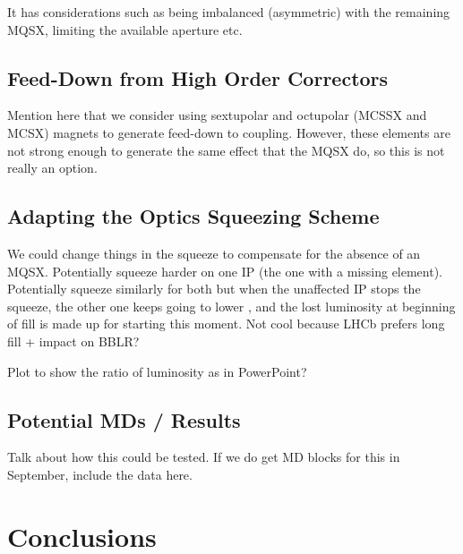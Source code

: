 It has considerations such as being imbalanced (asymmetric) with the remaining MQSX, limiting the available aperture etc.

\subsection{Feed-Down from High Order Correctors}

Mention here that we consider using sextupolar and octupolar (MCSSX and MCSX) magnets to generate feed-down to coupling.
However, these elements are not strong enough to generate the same effect that the MQSX do, so this is not really an option.

\subsection{Adapting the Optics Squeezing Scheme}

We could change things in the squeeze to compensate for the absence of an MQSX.
Potentially squeeze harder on one IP (the one with a missing element).
Potentially squeeze similarly for both but when the unaffected IP stops the squeeze, the other one keeps going to lower \betastar, and the lost luminosity at beginning of fill is made up for starting this moment.
Not cool because LHCb prefers long fill + impact on BBLR?

Plot to show the ratio of luminosity as in PowerPoint?

\subsection{Potential MDs / Results}

Talk about how this could be tested.
If we do get MD blocks for this in September, include the data here.


\section{Conclusions}

